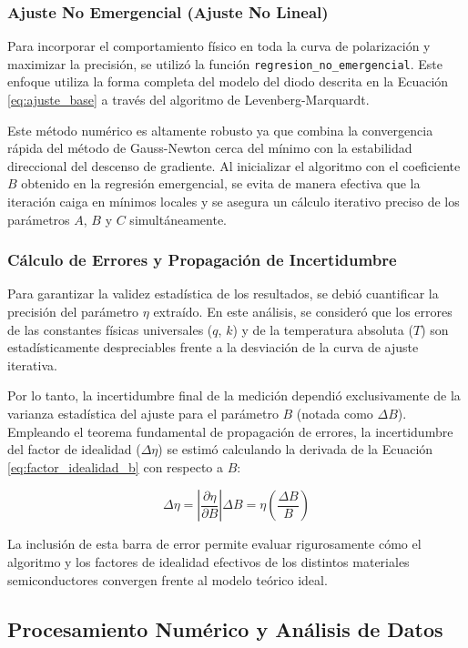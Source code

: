 \documentclass[conference]{IEEEtran}
\begin{document}
\subsubsection{Ajuste No Emergencial (Ajuste No Lineal)}
Para incorporar el comportamiento físico en toda la curva de polarización y maximizar la precisión, se utilizó la función \texttt{regresion\_no\_emergencial}. Este enfoque utiliza la forma completa del modelo del diodo descrita en la Ecuación \ref{eq:ajuste_base} a través del algoritmo de Levenberg-Marquardt.

Este método numérico es altamente robusto ya que combina la convergencia rápida del método de Gauss-Newton cerca del mínimo con la estabilidad direccional del descenso de gradiente. Al inicializar el algoritmo con el coeficiente $B$ obtenido en la regresión emergencial, se evita de manera efectiva que la iteración caiga en mínimos locales y se asegura un cálculo iterativo preciso de los parámetros $A$, $B$ y $C$ simultáneamente.

\subsubsection{Cálculo de Errores y Propagación de Incertidumbre}
Para garantizar la validez estadística de los resultados, se debió cuantificar la precisión del parámetro $\eta$ extraído. En este análisis, se consideró que los errores de las constantes físicas universales ($q$, $k$) y de la temperatura absoluta ($T$) son estadísticamente despreciables frente a la desviación de la curva de ajuste iterativa. 

Por lo tanto, la incertidumbre final de la medición dependió exclusivamente de la varianza estadística del ajuste para el parámetro $B$ (notada como $\Delta B$). Empleando el teorema fundamental de propagación de errores, la incertidumbre del factor de idealidad ($\Delta\eta$) se estimó calculando la derivada de la Ecuación \ref{eq:factor_idealidad_b} con respecto a $B$:

\begin{equation}
    \Delta\eta = \left| \frac{\partial \eta}{\partial B} \right| \Delta B = \eta \left( \frac{\Delta B}{B} \right)
\end{equation}

La inclusión de esta barra de error permite evaluar rigurosamente cómo el algoritmo y los factores de idealidad efectivos de los distintos materiales semiconductores convergen frente al modelo teórico ideal.

\subsection{Procesamiento Numérico y Análisis de Datos}
\label{subsec:procesamiento_main}
\end{document}
